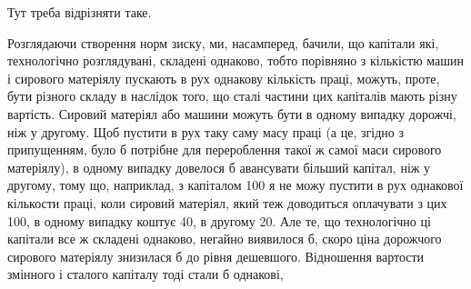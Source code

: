Тут треба відрізняти таке.

Розглядаючи створення норм зиску, ми, насамперед, бачили, що капітали
які, технологічно розглядувані, складені однаково, тобто порівняно з кількістю
машин і сирового матеріялу пускають в рух однакову кількість праці,
можуть, проте, бути різного складу в наслідок того, що сталі частини цих капіталів
мають різну вартість. Сировий матеріял або машини можуть бути в
одному випадку дорожчі, ніж у другому. Щоб пустити в рух таку саму масу
праці (а це, згідно з припущенням, було б потрібне для перероблення такої ж
самої маси сирового матеріялу), в одному випадку довелося б авансувати більший
капітал, ніж у другому, тому що, наприклад, з капіталом 100 я не можу пустити
в рух однакової кількости праці, коли сировий матеріял, який теж доводиться
оплачувати з цих 100, в одному випадку коштує 40, в другому 20.
Але те, що технологічно ці капітали все ж складені однаково, негайно виявилося
б, скоро ціна дорожчого сирового матеріялу знизилася б до рівня дешевшого.
Відношення вартости змінного і сталого капіталу тоді стали б однакові,
\parbreak{}  %

